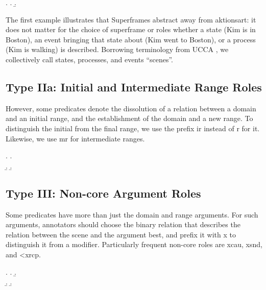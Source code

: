 \documentclass[a4paper]{article}
\begin{document}
\ex. \a. 
     \b. 

The first example illustrates that Superframes abstract away from aktionsart: it does not matter for the choice of superframe or roles whether a state (Kim is in Boston), an event bringing that state about (Kim went to Boston), or a process (Kim is walking) is described. Borrowing terminology from UCCA \citep{abend-rappoport-2013-universal}, we collectively call states, processes, and events ``scenes''.


\subsection{Type IIa: Initial and Intermediate Range Roles}

However, some predicates denote the dissolution of a relation between a domain and an initial range, and the establishment of the domain and a new range. To distinguish the initial from the final range, we use the prefix \textsf{ir} instead of \textsf{r} for it. Likewise, we use \textsf{mr} for intermediate ranges.

\ex. \a. \\
     \b. 
     \b. 


\subsection{Type III: Non-core Argument Roles}

Some predicates have more than just the domain and range arguments. For such arguments, annotators should choose the binary relation that describes the relation between the scene and the argument best, and prefix it with \textsf{x} to distinguish it from a modifier. Particularly frequent non-core roles are \textsf{xcau}, \textsf{xsnd}, and \textsf{<xrcp}.

\ex. \a. 
     \b. \\
     \b. 
     \b. 
\end{document}
